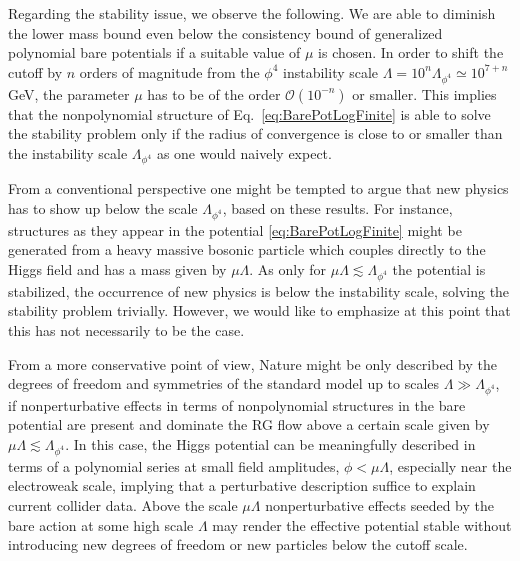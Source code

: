 \documentclass[twocolumn,aps,prd,showpacs,nofootinbib,superscriptaddress,preprintnumbers,floatfix,10pt]{revtex4-1}
\begin{document}
Regarding the stability issue, we observe the following. We are able to diminish the lower mass bound even below the consistency bound of generalized polynomial bare potentials if a suitable value of $\mu$ is chosen. In order to shift the cutoff by $n$ orders of magnitude from the $\phi^{4}$ instability scale $\Lambda = 10^{n} \Lambda_{\phi^{4}} \simeq 10^{7+n}$ GeV, the parameter $\mu$ has to be of the order $\mathcal{O}(10^{-n})$ or smaller. This implies that the nonpolynomial structure of Eq.~\eqref{eq:BarePotLogFinite} is able to solve the stability problem only if the radius of convergence is close to or smaller than the instability scale $\Lambda_{\phi^{4}}$ as one would naively expect. 


From a conventional perspective one might be tempted to argue that new physics has to show up below the scale $\Lambda_{\phi^{4}}$, based on these results. For instance, structures as they appear in the potential \eqref{eq:BarePotLogFinite} might be generated from a heavy massive bosonic particle which couples directly to the Higgs field and has a mass given by $\mu\Lambda$. As only for $\mu\Lambda \lesssim \Lambda_{\phi^{4}}$ the potential is stabilized, the occurrence of new physics is below the instability scale, solving the stability problem trivially. However, we would like to emphasize at this point that this has not necessarily to be the case. 


From a more conservative point of view, Nature might be only described by the degrees of freedom and symmetries of the standard model up to scales $\Lambda \gg \Lambda_{\phi^{4}}$, if nonperturbative effects in terms of nonpolynomial structures in the bare potential are present and dominate the RG flow above a certain scale given by $\mu\Lambda \lesssim \Lambda_{\phi^{4}}$. 
In this case, the Higgs potential can be meaningfully described in terms of a polynomial series at small field amplitudes, $\phi < \mu\Lambda$, especially near the electroweak scale, implying that a perturbative description suffice to explain current collider data. Above the scale $\mu\Lambda$ nonperturbative effects seeded by the bare action at some high scale $\Lambda$ may render the effective potential stable without introducing new degrees of freedom or new particles below the cutoff scale. 
\end{document}
